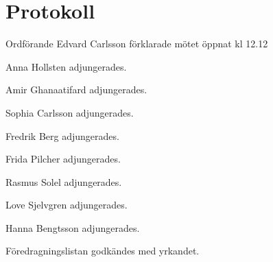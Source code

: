 \documentclass[10pt]{article}
\def\mo{Edvard Carlsson}
\begin{document}
\section*{Protokoll}
\begin{paragrafer}
Ordförande {\mo} förklarade mötet öppnat kl 12.12

{\valavmo}

{\valavms}

{\valavj}

{\tosg}


Anna Hollsten adjungerades. 

Amir Ghanaatifard adjungerades.

Sophia Carlsson adjungerades.

Fredrik Berg adjungerades.

Frida Pilcher adjungerades.

Rasmus Solel adjungerades.

Love Sjelvgren adjungerades.

Hanna Bengtsson adjungerades. 






Föredragningslistan godkändes med yrkandet.



\end{paragrafer}
\end{document}
